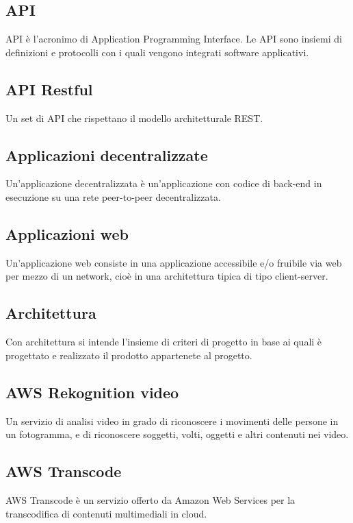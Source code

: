 \subsection*{API}
API è l'acronimo di Application Programming Interface. Le API sono insiemi di definizioni e protocolli con i quali vengono integrati software applicativi.

\subsection*{API Restful}
Un set di API che rispettano il modello architetturale REST.

\subsection*{Applicazioni decentralizzate}
Un'applicazione decentralizzata è un'applicazione con codice di back-end in esecuzione su una rete peer-to-peer decentralizzata.

\subsection*{Applicazioni web}
Un'applicazione web consiste in una applicazione accessibile e/o fruibile via web per mezzo di un network, cioè in una architettura tipica di tipo client-server.

\subsection*{Architettura}
Con architettura si intende l'insieme di criteri di progetto in base ai quali è progettato e realizzato il prodotto appartenete al progetto.

\subsection*{AWS Rekognition video}
Un servizio di analisi video in grado di riconoscere i movimenti delle persone in un fotogramma, e di riconoscere soggetti, volti, oggetti e altri contenuti nei video.

\subsection*{AWS Transcode}
AWS Transcode è un servizio offerto da Amazon Web Services per la transcodifica di contenuti multimediali in cloud.


